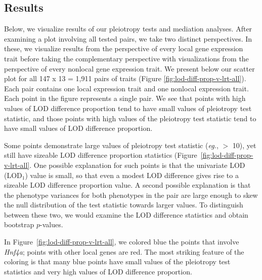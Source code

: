 \documentclass[oneside]{book}\usepackage[]{graphicx}\usepackage[]{color}
\begin{document}
\subsection{Results}

Below, we visualize results of our pleiotropy tests and mediation analyses. 
After examining a plot involving all tested pairs, we take two distinct perspectives. 
In these, we visualize results from the perspective of every local gene expression trait 
before taking the complementary perspective with visualizations from the 
perspective of every nonlocal gene expression trait.
We present below our scatter plot for all 147 x 13 = 1,911 
pairs of traits (Figure \ref{fig:lod-diff-prop-v-lrt-all}). 
Each pair contains one local expression trait and one nonlocal expression trait. 
Each point in the figure represents a single pair. 
We see that points with high values of LOD difference proportion tend to have small 
values of pleiotropy test statistic, and those points with high values of the 
pleiotropy test statistic tend to have small values of LOD difference proportion. 

Some points demonstrate large values of pleiotropy test statistic (\emph{eg.}, $>$ 10), 
yet still have sizeable LOD difference proportion statistics (Figure~\ref{fig:lod-diff-prop-v-lrt-all}. 
One possible explanation for such points is that the univariate LOD (LOD$_1$) value is small, 
so that even a modest LOD difference gives rise to a sizeable LOD difference proportion value. 
A second possible explanation is that the phenotype variances for both phenotypes in the pair 
are large enough to skew the null distribution of the test statistic towards larger values. 
To distinguish between these two, we would 
examine the LOD difference statistics and obtain bootstrap $p$-values.

In Figure~\ref{fig:lod-diff-prop-v-lrt-all}, we colored blue the points that involve \emph{Hnf4a}; 
points with other local genes are red. 
The most striking feature of the coloring is that many blue points have small 
values of the pleiotropy test statistics and very high values of LOD difference proportion.
\end{document}
